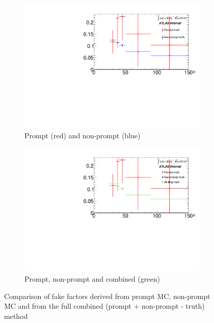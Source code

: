 \documentclass[11pt]{article}
\begin{document}
	\begin{figure}[H]
	\centering
	\begin{subfigure}{.5\textwidth}
	\centering
	\includegraphics[width=1.\linewidth]{figures/FakesEstimate_data_pp8_nonallhad_new_SubtractionFix_newOverlay/Overlay_FF_CompareFF_prompt_nonprompt.pdf}
  	\caption{Prompt (red) and non-prompt (blue)  }
  	\label{fig:sub1}
	\end{subfigure}%
	\begin{subfigure}{.5\textwidth}
	\centering
	\includegraphics[width=1.\linewidth]{figures/FakesEstimate_data_pp8_nonallhad_new_SubtractionFix_newOverlay/Overlay_FF_CompareFF_all.pdf}
	\caption{Prompt, non-prompt and combined (green) }
	\end{subfigure}
	\caption{Comparison of fake factors derived from prompt MC, non-prompt MC and from the full combined (prompt + non-prompt - truth) method}
	\end{figure}
\end{document}
